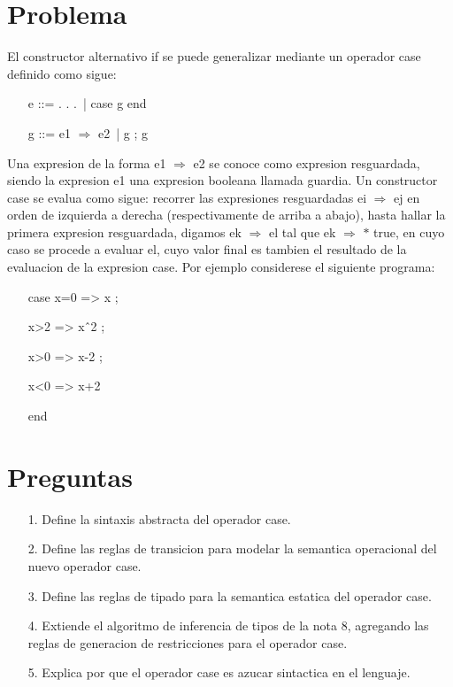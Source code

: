 \documentclass{article}
\begin{document}
    \section{Problema}
    El constructor alternativo if se puede generalizar mediante un operador case definido como sigue:

        \begin{itemize}
            \item[ ] e ::= . . . \,| case g end
            \item[ ] g ::= e1 $\Rightarrow$ e2 \,| g ; g 
        \end{itemize}

    Una expresion de la forma e1 $\Rightarrow$ e2 se conoce como expresion resguardada, siendo la expresion e1 una expresion booleana llamada guardia. Un constructor case se evalua como sigue: recorrer las expresiones resguardadas ei $\Rightarrow$ ej en orden de izquierda a derecha (respectivamente de arriba a abajo), hasta hallar la primera expresion resguardada, digamos ek $\Rightarrow$ el tal que ek $\Rightarrow$ $*$ true, en cuyo caso se procede a evaluar el, cuyo valor final es tambien el resultado de la evaluacion de la expresion case. Por ejemplo considerese el siguiente programa:

        \begin{itemize}
            \item[ ] case x=0 => x ;
            \item[ ] x>2 => xˆ2 ;
            \item[ ] x>0 => x-2 ;
            \item[ ] x<0 => x+2
            \item[ ] end
        \end{itemize}

    \section{Preguntas}
    \begin{itemize}
        \item[1.] Define la sintaxis abstracta del operador case.
        \item[2.] Define las reglas de transicion para modelar la semantica operacional del nuevo operador case.
        \item[3.] Define las reglas de tipado para la semantica estatica del operador case.
        \item[4.] Extiende el algoritmo de inferencia de tipos de la nota 8, agregando las reglas de generacion de restricciones para el operador case.
        \item[5.] Explica por que el operador case es azucar sintactica en el lenguaje.
    \end{itemize}
\end{document}
